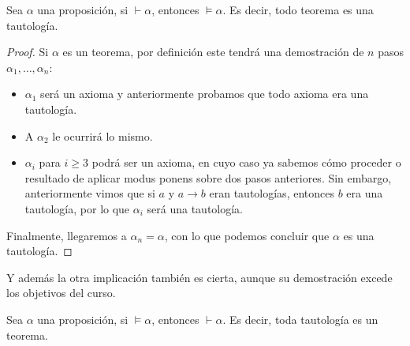 \begin{teo}[de coherencia]
    Sea $\alpha$ una proposición, si $\vdash \alpha$, entonces $\vDash \alpha$. Es decir, todo teorema es una tautología.
    \begin{proof}
        Si $\alpha$ es un teorema, por definición este tendrá una demostración de $n$ pasos $\alpha_1,\ldots,\alpha_n$:
        \begin{itemize}
            \item $\alpha_1$ será un axioma y anteriormente probamos que todo axioma era una tautología.
            \item A $\alpha_2$ le ocurrirá lo mismo.
            \item $\alpha_i$ para $i\geq 3$ podrá ser un axioma, en cuyo caso ya sabemos cómo proceder o resultado de aplicar modus ponens sobre dos pasos anteriores. Sin embargo, anteriormente vimos que si $a$ y $a\to b$ eran tautologías, entonces $b$ era una tautología, por lo que $\alpha_i$ será una tautología.
        \end{itemize}
        Finalmente, llegaremos a $\alpha_n = \alpha$, con lo que podemos concluir que $\alpha$ es una tautología.
    \end{proof}
\end{teo}

Y además la otra implicación también es cierta, aunque su demostración excede los objetivos del curso.

\begin{teo}[de adecuación]
    Sea $\alpha$ una proposición, si $\vDash \alpha$, entonces $\vdash \alpha$. Es decir, toda tautología es un teorema.
\end{teo}

